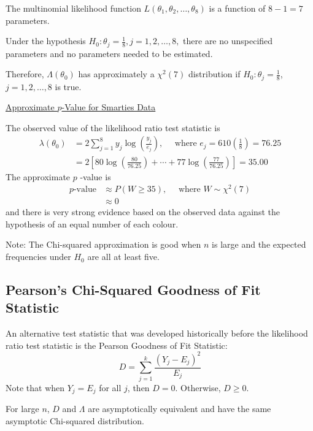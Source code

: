 The multinomial likelihood function $L\left(\theta_{1}, \theta_{2}, \ldots, \theta_{8}\right)$ is
a function of $8-1=7$ parameters.

Under the hypothesis $H_{0}: \theta_{j}=\frac{1}{8}, j=1,2, \ldots, 8,$ there are no
unspecified parameters and no parameters needed to be estimated.

Therefore, $\Lambda\left(\theta_{0}\right)$ has approximately a $\chi^{2}(7)$ distribution if
$H_{0}: \theta_{j}=\frac{1}{8} $, $ j=1,2, \ldots, 8$ is true.

\underline{Approximate $ p $-Value for Smarties Data}

The observed value of the likelihood ratio test statistic is
\[
    \begin{aligned}
        \lambda\left(\theta_{0}\right) & =2 \sum_{j=1}^{8} y_{j} \log \left(\frac{y_{j}}{e_{j}}\right), \quad \text { where } e_{j}=610\left(\frac{1}{8}\right)=76.25 \\
                                       & =2\left[80 \log \left(\frac{80}{76.25}\right)+\cdots+77 \log \left(\frac{77}{76.25}\right)\right]=35.00
    \end{aligned}
\]
The approximate $p$ -value is
\[
    \begin{aligned}
        p\text {-value}
         & \approx P(W \geq 35), \quad \text { where } W \sim \chi^{2}(7) \\
         & \approx 0
    \end{aligned}
\]
and there is very strong evidence based on the observed data against the hypothesis of
an equal number of each colour.

Note: The Chi-squared approximation is good when $n$ is large and the expected
frequencies under $H_{0}$ are all at least five.

\subsection{Pearson's Chi-Squared Goodness of Fit Statistic}

An alternative test statistic that was developed historically before the likelihood ratio
test statistic is the Pearson Goodness of Fit Statistic:
\[
    D=\sum_{j=1}^{k} \frac{\left(Y_{j}-E_{j}\right)^{2}}{E_{j}}
\]
Note that when $Y_{j}=E_{j}$ for all $j$, then $D=0$.
Otherwise, $D \geq 0$.

For large $ n $, $ D $ and $ \Lambda $ are asymptotically equivalent and have the
same asymptotic Chi-squared distribution.


